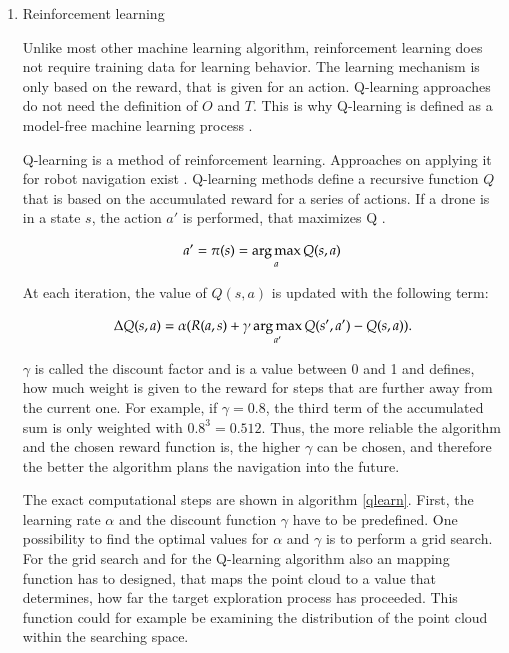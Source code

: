 	\begin{enumerate}
	
	\item{Reinforcement learning}
	
	Unlike most other machine learning algorithm, reinforcement learning does not require training data for learning behavior. The learning mechanism is only based 
	on the reward, that is given for an action. %
	Q-learning approaches do not need the definition of $O$ and $T$. This is why Q-learning is defined as a model-free machine learning process \cite{deep}. 
	
	Q-learning is a method of reinforcement learning. Approaches on applying it for robot navigation exist \cite{accurat}\cite{deep}\cite{lopez}. 
	Q-learning methods define a recursive function $Q$ that is based on the accumulated reward for a series of actions. If a drone is in a state $s$, the action $a'$ is performed, 
	that maximizes Q \cite{lopez}. 
	
	$$a' = \pi(s) = \mathop{\mathrm{arg\,max}}_{a} Q(s,a)$$
	
	At each iteration, the value of $Q(s,a)$ is updated with the following term: 
	
	\begin{equation}\label{update}
    \Delta Q(s,a) = \alpha(R(a,s) + 	\gamma \mathop{\mathrm{arg\,max}}_{a'}Q(s', a') - Q(s, a)).
	\end{equation}
	
	$\gamma$ is called the discount factor and is a value between 0 and 1 and defines, how much weight is given to the reward for steps that are further away from the current one. 
	For example, if $\gamma = 0.8$, the third term of the accumulated sum is only weighted with ${0.8}^3 = 0.512$. Thus, the more reliable the algorithm 
	and the chosen reward function is, the higher $\gamma$ can be chosen, and therefore the better the algorithm plans the navigation into the future. 
	
	The exact computational steps are shown in algorithm \ref{qlearn}. 
	First, the learning rate $\alpha$ and the discount function $\gamma$ have to be predefined. One possibility to find the optimal values for $\alpha$ and 
    $\gamma$ is to perform a grid search. For the grid search and for the Q-learning algorithm also an mapping function has to designed, that maps 
	the point cloud to a value that determines, how far the target exploration process has proceeded. This function could for example be examining the distribution of the point cloud within the searching space. 
	

\end{enumerate}
